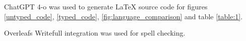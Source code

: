 

ChatGPT 4-o was used to generate LaTeX source code for figures \ref{untyped_code}, \ref{typed_code}, \ref{fig:language_comparison} and table \ref{table:1}. 

Overleafs Writefull integration was used for spell checking.